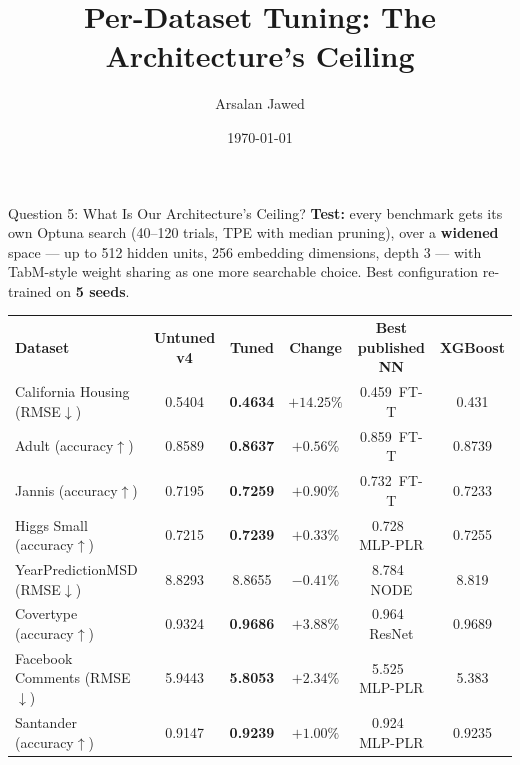 \documentclass[aspectratio=169, xcolor=table]{beamer}
\title[Bagged Expert Ensembles]{Per-Dataset Tuning: The Architecture's Ceiling}
\author{Arsalan Jawed}
\institute{University of Hildesheim}
\date{\today}
\begin{document}
\begin{frame}{Question 5: What Is Our Architecture's Ceiling?}
    \small
    \textbf{Test:} every benchmark gets its own Optuna search (40--120 trials, TPE with median
    pruning), over a \textbf{widened} space --- up to 512 hidden units, 256 embedding dimensions,
    depth 3 --- with TabM-style weight sharing as one more searchable choice.
    Best configuration re-trained on \textbf{5 seeds}.
    \vspace{0.05cm}
    \begin{table}
        \centering
        \renewcommand{\arraystretch}{1.08}
        \scriptsize
        \begin{tabular}{l | c | c | c | c | c}
            \rowcolor{PrimaryColor} \color{white}\textbf{Dataset} & \color{white}\textbf{Untuned v4} & \color{white}\textbf{Tuned} & \color{white}\textbf{Change} & \color{white}\textbf{Best published NN} & \color{white}\textbf{XGBoost} \\
            California Housing (RMSE$\downarrow$) & 0.5404 & \textbf{0.4634} & \cellcolor{WinGreen}$+14.25\%$ & 0.459 \,{\scriptsize FT-T} & 0.431 \\
            \rowcolor{LightGrey} Adult (accuracy$\uparrow$) & 0.8589 & \textbf{0.8637} & \cellcolor{WinGreen}$+0.56\%$ & 0.859 \,{\scriptsize FT-T} & 0.8739 \\
            Jannis (accuracy$\uparrow$) & 0.7195 & \textbf{0.7259} & \cellcolor{WinGreen}$+0.90\%$ & 0.732 \,{\scriptsize FT-T} & 0.7233 \\
            \rowcolor{LightGrey} Higgs Small (accuracy$\uparrow$) & 0.7215 & \textbf{0.7239} & \cellcolor{WinGreen}$+0.33\%$ & 0.728 \,{\scriptsize MLP-PLR} & 0.7255 \\
            YearPredictionMSD (RMSE$\downarrow$) & 8.8293 & 8.8655 & \cellcolor{LossRed}$-0.41\%$ & 8.784 \,{\scriptsize NODE} & 8.819 \\
            \rowcolor{LightGrey} Covertype (accuracy$\uparrow$) & 0.9324 & \textbf{0.9686} & \cellcolor{WinGreen}$+3.88\%$ & 0.964 \,{\scriptsize ResNet} & 0.9689 \\
            Facebook Comments (RMSE$\downarrow$) & 5.9443 & \textbf{5.8053} & \cellcolor{WinGreen}$+2.34\%$ & 5.525 \,{\scriptsize MLP-PLR} & 5.383 \\
            \rowcolor{LightGrey} Santander (accuracy$\uparrow$) & 0.9147 & \textbf{0.9239} & \cellcolor{WinGreen}$+1.00\%$ & 0.924 \,{\scriptsize MLP-PLR} & 0.9235 \\

\end{tabular}
\end{table}
\end{frame}
\end{document}
